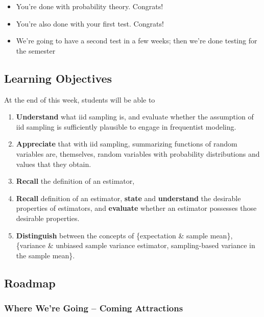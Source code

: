 \documentclass[
]{book}
\providecommand{\tightlist}{%
  \setlength{\itemsep}{0pt}\setlength{\parskip}{0pt}}
\theoremstyle{definition}
\theoremstyle{definition}
\theoremstyle{definition}
\theoremstyle{definition}
\theoremstyle{remark}
\begin{document}
\begin{itemize}
\tightlist
\item
  You're done with probability theory. Congrats!
\item
  You're also done with your first test. Congrats!
\item
  We're going to have a second test in a few weeks; then we're done testing for the semester
\end{itemize}

\hypertarget{learning-objectives-4}{%
\subsection{Learning Objectives}\label{learning-objectives-4}}

At the end of this week, students will be able to

\begin{enumerate}
\def\labelenumi{\arabic{enumi}.}
\tightlist
\item
  \textbf{Understand} what iid sampling is, and evaluate whether the assumption of iid sampling is sufficiently plausible to engage in frequentist modeling.
\item
  \textbf{Appreciate} that with iid sampling, summarizing functions of random variables are, themselves, random variables with probability distributions and values that they obtain.
\item
  \textbf{Recall} the definition of an estimator,
\item
  \textbf{Recall} definition of an estimator, \textbf{state} and \textbf{understand} the desirable properties of estimators, and \textbf{evaluate} whether an estimator possesses those desirable properties.
\item
  \textbf{Distinguish} between the concepts of \{expectation \& sample mean\}, \{variance \& unbiased sample variance estimator, sampling-based variance in the sample mean\}.
\end{enumerate}

\hypertarget{roadmap-1}{%
\subsection{Roadmap}\label{roadmap-1}}

\hypertarget{where-were-going-coming-attractions}{%
\subsubsection{Where We're Going -- Coming Attractions}\label{where-were-going-coming-attractions}}
\end{document}
